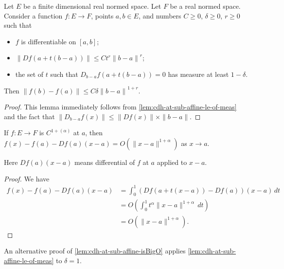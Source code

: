 \begin{corollary}%
  \label{cor:cdh-at-sub-affine-le-of-meas-fderiv}
  Let \(E\) be a finite dimensional real normed space.
  Let \(F\) be a real normed space.
  Consider a function \(f\colon E\to F\), points \(a, b \in E\),
  and numbers \(C\ge 0\), \(\delta\ge 0\), \(r \ge 0\) such that
  \begin{itemize}
  \item \(f\) is differentiable on \([a, b]\);
  \item \(\|Df(a + t(b - a))\| \le Ct^{r}{\|b - a\|}^r\);
  \item the set of \(t\) such that \(D_{b - a}f(a + t(b - a)) = 0\)
    has measure at least \(1 - \delta\).
  \end{itemize}
  Then \(\|f(b) - f(a)\| \le C\delta{\|b - a\|}^{1+r}\).
\end{corollary}

\begin{proof}
  This lemma immediately follows from \autoref{lem:cdh-at-sub-affine-le-of-meas}
  and the fact that \(\|D_{b-a}f(x)\|\le \|Df(x)\|\times\|b - a\|\).
\end{proof}

\begin{corollary}%
  \label{cor:sub-isBigO-rpow-of-fderiv}
  
\end{corollary}

\begin{lemma}%
  \label{lem:cdh-at-sub-affine-isBigO}
  If \(f\colon E \to F\) is \(C^{1+(\alpha)}\) at \(a\),
  then \(f(x) - f(a) - Df(a)(x - a) = O\left(\|x - a\|^{1 + \alpha}\right)\) as \(x \to a\).
\end{lemma}
Here \(Df(a)(x - a)\) means differential of \(f\) at \(a\) applied to \(x - a\).

\begin{proof}
  We have
  \begin{align*}
    f(x) - f(a) - Df(a)(x - a) &= \int_{0}^{1}\left(Df(a + t(x - a)) - Df(a)\right)(x - a)\,dt\\
                               &= O\left(\int_{0}^{1}t^{\alpha}\|x - a\|^{1+\alpha}\,dt\right)\\
                               &= O\left(\|x - a\|^{1 + \alpha}\right).
  \end{align*}
\end{proof}

\begin{remark}
  An alternative proof of \autoref{lem:cdh-at-sub-affine-isBigO}
  applies \autoref{lem:cdh-at-sub-affine-le-of-meas} to \(\delta=1\).
\end{remark}

